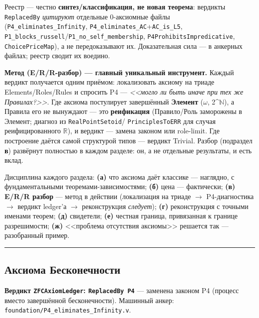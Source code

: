 \documentclass[11pt,a4paper]{article}
\begin{document}
Реестр --- честно \textbf{синтез/классификация, не новая теорема}: вердикты \texttt{Replaced\allowbreak{}By} \emph{цитируют} отдельные 0-аксиомные файлы (\texttt{P4\_\allowbreak{}eliminates\_\allowbreak{}Infinity}, \texttt{P4\_\allowbreak{}eliminates\_\allowbreak{}AC}+\texttt{AC\_\allowbreak{}is\_\allowbreak{}L5}, \texttt{P1\_\allowbreak{}blocks\_\allowbreak{}russell}/\texttt{P1\_\allowbreak{}no\_\allowbreak{}self\_\allowbreak{}membership}, \texttt{P4Prohibits\allowbreak{}Impredicative}, \texttt{Choice\allowbreak{}Price\allowbreak{}Map}), а не передоказывают их. Доказательная сила --- в анкерных файлах; реестр сводит их воедино.

\textbf{Метод (E/R/R-разбор) --- главный уникальный инструмент.} Каждый вердикт получается одним приёмом: локализовать аксиому на триаде Elements/Roles/Rules и спросить P4 --- \emph{<<могло ли быть иначе при тех же Правилах?>>}. Где аксиома постулирует завершённый \textbf{Элемент} ($\omega$, 2\textasciicircum{}$\mathbb{N}$), а Правила его не вынуждают --- это \textbf{реификация} (Правило/Роль заморожены в Элемент; диагноз из \texttt{Real\allowbreak{}Point\allowbreak{}Setoid}/ \texttt{Principles\allowbreak{}To\allowbreak{}ERR} для случая реифицированного $\mathbb{R}$), и вердикт --- замена законом или role-limit. Где построение даётся самой структурой типов --- вердикт Trivial. Разбор (подраздел \textbf{в}) развёрнут полностью в каждом разделе: он, а не отдельные результаты, и есть вклад.

Дисциплина каждого раздела: \textbf{(а)} что аксиома даёт классике --- наглядно, с фундаментальными теоремами-зависимостями; \textbf{(б)} цена --- фактически; \textbf{(в) E/R/R разбор} --- метод в действии (локализация на триаде $\to$ P4-диагностика $\to$ вердикт ledger'а $\to$ реконструкция \emph{следует}); \textbf{(г)} реконструкция с точными именами теорем; \textbf{(д)} свидетели; \textbf{(е)} честная граница, привязанная к границе разрешимости; \textbf{(ж)} <<проблема отсутствия аксиомы>> решается так --- разобранный пример.

\bigskip\hrule\bigskip

\subsection{Аксиома Бесконечности}

\textbf{Вердикт \texttt{ZFCAxiom\allowbreak{}Ledger}: \texttt{Replaced\allowbreak{}By P4}} --- заменена законом P4 (процесс вместо завершённой бесконечности). Машинный анкер: \texttt{foundation/\allowbreak{}P4\_\allowbreak{}eliminates\_\allowbreak{}Infinity.v}.
\end{document}
